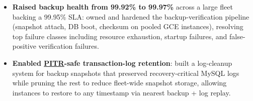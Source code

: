 \documentclass{resume}
\begin{document}
\begin{itemize}
  \item \textbf{Raised backup health from 99.92\% to 99.97\%} across a large fleet backing a 99.95\% SLA: owned and hardened the backup-verification pipeline (snapshot attach, DB boot, checksum on pooled GCE instances), resolving top failure classes including resource exhaustion, startup failures, and false-positive verification failures.
  \item \textbf{Enabled \href{https://cloud.google.com/sql/docs/mysql/backup-recovery/manage-standard-backups\#point-in-time_recovery}{PITR}-safe transaction-log retention}: built a log-cleanup system for backup snapshots that preserved recovery-critical MySQL logs while pruning the rest to reduce fleet-wide snapshot storage, allowing instances to restore to any timestamp via nearest backup + log replay.

\end{itemize}
\end{document}
